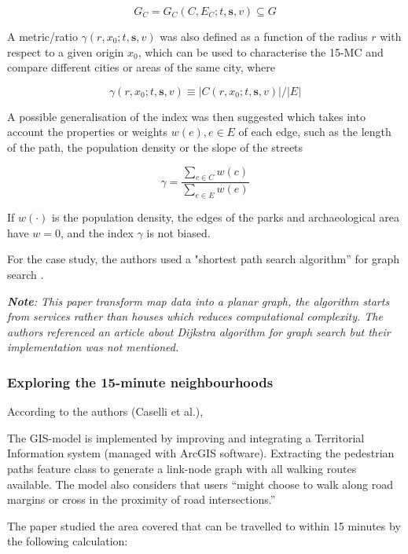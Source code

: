 $$ G_C=G_C(C,E_C;t,\mathbf s,v)\subseteq G $$

A metric/ratio $\gamma(r,x_0;t,\mathbf s,v)$ was also defined as a function of the radius $r$ with respect to a given origin $x_0$, which can be used to characterise the 15-MC and compare different cities or areas of the same city, where

$$ \gamma(r,x_0;t,\mathbf s,v)\equiv|C(r,x_0;t,\mathbf s,v)|/|E| $$

A possible generalisation of the index was then suggested which takes into account the properties or weights $w(e),e\in E$ of each edge, such as the length of the path, the population density or the slope of the streets

$$ \gamma=\frac{\sum_{c\in C}w(c)}{\sum_{e\in E}w(e)} $$

If $w(\cdot)$ is the population density, the edges of the parks and archaeological area have $w = 0$, and the index $\gamma$ is not biased.

For the case study, the authors used a "shortest path search algorithm” for graph search \cite{dijkstra_note_1959}.

\textit{\textbf{Note}: This paper transform map data into a planar graph, the algorithm starts from services rather than houses which reduces computational complexity. The authors referenced an article about Dijkstra algorithm for graph search but their implementation was not mentioned.}

\subsubsection{Exploring the 15-minute neighbourhoods}

According to the authors (Caselli et al.),  \cite{caselli_exploring_2022}

The GIS-model is implemented by improving and integrating a Territorial Information system (managed with ArcGIS software). Extracting the pedestrian paths feature class to generate a link-node graph with all walking routes available. The model also considers that users “might choose to walk along road margins or cross in the proximity of road intersections.”

The paper studied the area covered that can be travelled to  within 15 minutes by the following calculation:

